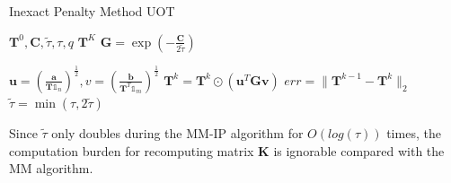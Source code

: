 \documentclass[a4paper,twocolumn]{article}
\newcommand{\one}{\mathds{1}}
\newcommand{\mat}[1]{\mathbf{#1}}
\renewcommand{\vec}[1]{\bm{#1}}
\begin{document}
\begin{algorithm}[t]
\caption{Inexact Penalty Method UOT}
\begin{algorithmic}[t]
\label{Alg1}
\renewcommand{\algorithmicrequire}{\textbf{Input:}}
\renewcommand{\algorithmicensure}{\textbf{Output:}}
\REQUIRE $\mat{T}^0, \mat C, \tilde{\tau}, \tau, q$
\ENSURE $\mat T^{K}$
\STATE $\mat G = \operatorname{exp}(-\frac{\mat{C}}{2\tilde{\tau}})$

\STATE $\vec{u} = (\frac{\vec{a}}{\mat T \one_n})^{\frac{1}{2}}, v=(\frac{\vec{b}}{\mat{T}^{T} \one_m})^{\frac{1}{2}}$
\STATE $\mat{T}^{k} = \mat T^{k} \odot ( \vec{u}^{T} \mat G \vec{v})$
\STATE $err = \|\mat T^{k-1} - \mat T^{k}\|_2$
\STATE $\tilde{\tau} = \min(\tau, 2\tilde{\tau})$
\ENDIF
\ENDFOR
\end{algorithmic}
\end{algorithm}
Since $\tilde{\tau}$ only doubles during the MM-IP algorithm for $O(log(\tau))$ times, the computation burden for recomputing matrix $\mat K$ is ignorable compared with the MM algorithm.
\end{document}
